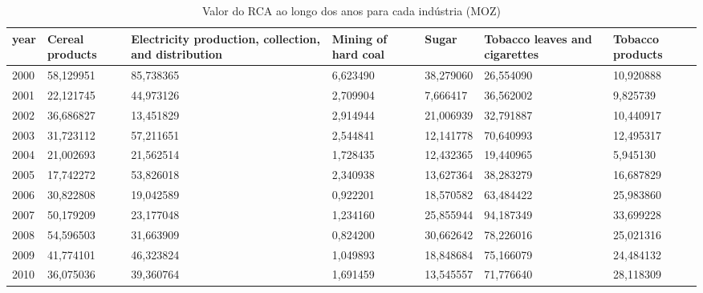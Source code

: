 \begin{table}
\centering
\caption{Valor do RCA ao longo dos anos para cada indústria (MOZ)}
\begin{tabular}{p{1cm}p{2cm}p{2cm}p{2cm}p{2cm}p{2cm}p{2cm}}
\toprule
 year &  Cereal products &  Electricity production, collection, and distribution &  Mining of hard coal &     Sugar &  Tobacco leaves and cigarettes &  Tobacco products \\
\midrule
 2000 &        58,129951 &                                          85,738365 &             6,623490 & 38,279060 &                      26,554090 &         10,920888 \\
 2001 &        22,121745 &                                          44,973126 &             2,709904 &  7,666417 &                      36,562002 &          9,825739 \\
 2002 &        36,686827 &                                          13,451829 &             2,914944 & 21,006939 &                      32,791887 &         10,440917 \\
 2003 &        31,723112 &                                          57,211651 &             2,544841 & 12,141778 &                      70,640993 &         12,495317 \\
 2004 &        21,002693 &                                          21,562514 &             1,728435 & 12,432365 &                      19,440965 &          5,945130 \\
 2005 &        17,742272 &                                          53,826018 &             2,340938 & 13,627364 &                      38,283279 &         16,687829 \\
 2006 &        30,822808 &                                          19,042589 &             0,922201 & 18,570582 &                      63,484422 &         25,983860 \\
 2007 &        50,179209 &                                          23,177048 &             1,234160 & 25,855944 &                      94,187349 &         33,699228 \\
 2008 &        54,596503 &                                          31,663909 &             0,824200 & 30,662642 &                      78,226016 &         25,021316 \\
 2009 &        41,774101 &                                          46,323824 &             1,049893 & 18,848684 &                      75,166079 &         24,484132 \\
 2010 &        36,075036 &                                          39,360764 &             1,691459 & 13,545557 &                      71,776640 &         28,118309 \\

\end{tabular}
\end{table}
